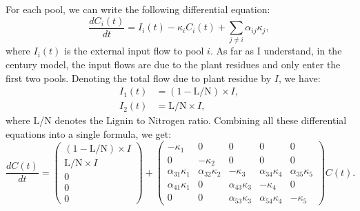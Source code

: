 \documentclass[10pt,a4paper]{article}
\begin{document}
For each pool, we can write the following differential equation:
\begin{equation*}
\frac{d C_i(t)}{dt} = I_i(t) -\kappa_i C_i(t) + \sum_{j\neq i} \alpha_{ij} \kappa_j,
\end{equation*}
where $I_i(t)$ is the external input flow to pool $i$. As far as I understand, in the century model, the input flows are due to the plant residues and only enter the first two pools. Denoting the total flow due to plant residue by $I$, we have:
\begin{align*}
I_1(t) & = (1-\text{L/N})\times I, \\
I_2(t) & = \text{L/N}\times I,
\end{align*}
where L/N denotes the Lignin to Nitrogen ratio. Combining all these differential equations into a single formula, we get:
\begin{equation*}
\frac{dC(t)}{dt} = \left( {\begin{array}{c}
   (1-\text{L/N})\times I \\ \text{L/N}\times I \\ 0   \\ 0 \\ 0  \end{array} } \right) + 
   \left( {\begin{array}{ccccc}
   -\kappa_1 & 0 & 0 & 0 & 0 \\       
   0 & -\kappa_2 & 0 & 0 & 0 \\ 
   \alpha_{31}\kappa_1 & \alpha_{32}\kappa_2 & -\kappa_3 & \alpha_{34}\kappa_4 & \alpha_{35}\kappa_5 \\
   \alpha_{41}\kappa_1 & 0 & \alpha_{43}\kappa_3 & -\kappa_4& 0  \\
   0 & 0 & \alpha_{53}\kappa_3 & \alpha_{54}\kappa_4 & -\kappa_5    
   \end{array} } \right) C(t).
\end{equation*}
\end{document}
